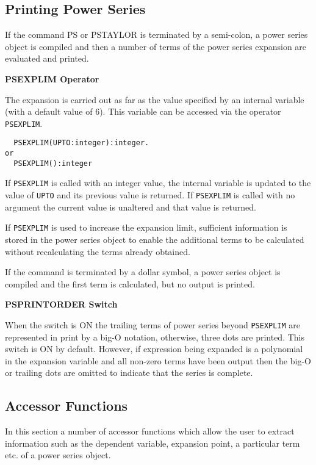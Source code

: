\subsection{Printing Power Series}

If the command \f{PS} or \f{PSTAYLOR} is terminated by a semi-colon, a power
series object is compiled and then a number of terms of the
power series expansion are evaluated and printed.

\textbf{PSEXPLIM Operator}

The expansion is carried out as far as the value specified by an internal
variable (with a default value of 6). This variable can be accessed via the
operator \texttt{PSEXPLIM}.
\begin{verbatim}
  PSEXPLIM(UPTO:integer):integer.
or
  PSEXPLIM():integer
\end{verbatim}
If \texttt{PSEXPLIM} is called with an integer value, the internal variable is
updated to the value of \texttt{UPTO} and its previous value is returned.
If \texttt{PSEXPLIM} is called with no argument the current value is unaltered
and that value is returned. 

If \texttt{PSEXPLIM} is used to increase the expansion limit, sufficient
information is stored in the power series object to enable the additional
terms to be calculated without recalculating the terms already obtained.

If the command is terminated by a dollar symbol, a power series object
is compiled and the first term is calculated, but no output is printed.

\textbf{PSPRINTORDER Switch}
\hypertarget{switch:PSPRINTORDER}{}

When the switch  is ON the trailing terms of power series
beyond \texttt{PSEXPLIM} are represented in print by a big-O notation,
otherwise, three dots are printed. This switch is ON by default.
However, if expression being expanded is a polynomial in the expansion
variable and all non-zero terms have been output then the big-O or trailing
dots are omitted to indicate that the series is complete.

\subsection{Accessor Functions}
In this section a number of accessor functions which allow the user to extract
information such as the dependent variable, expansion point, a particular term
etc. of a power series object.

